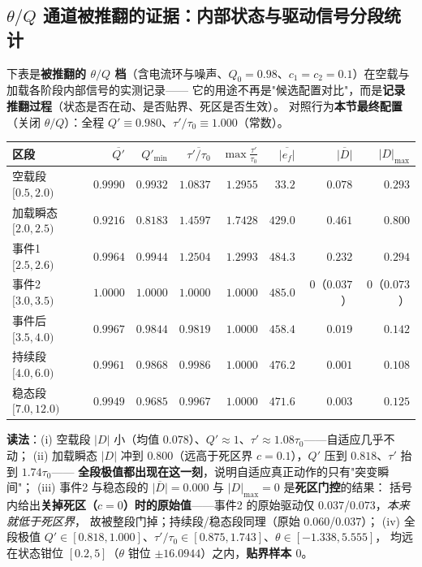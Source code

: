 \documentclass[11pt]{article}
\theoremstyle{remark}\newtheorem{remark}{注}
\newcommand{\ef}{e_f}
\begin{document}
\subsection{$\theta/Q$ 通道被推翻的证据：内部状态与驱动信号分段统计}\label{sec:pmsm-states}
下表是\textbf{被推翻的 $\theta/Q$ 档}（含电流环与噪声、$Q_0=0.98$、$c_1=c_2=0.1$）在空载与加载各阶段内部信号的实测记录——
它的用途不再是"候选配置对比"，而是\textbf{记录推翻过程}（状态是否在动、是否贴界、死区是否生效）。
对照行为\textbf{本节最终配置}（关闭 $\theta/Q$）：全程 $Q'\equiv0.980$、$\tau'/\tau_0\equiv1.000$（常数）。
\begin{center}
\footnotesize
\begin{tabular}{@{}lrrrrrrr@{}}
\toprule
区段 & $\overline{Q'}$ & $Q'_{\min}$ & $\overline{\tau'/\tau_0}$ & $\max\frac{\tau'}{\tau_0}$ & $\overline{|\ef|}$ & $\overline{|D|}$ & $|D|_{\max}$\\
\midrule
空载段 $[0.5,2.0)$ & $0.9990$ & $0.9932$ & $1.0837$ & $1.2955$ & $33.2$ & $0.078$ & $0.293$\\
加载瞬态 $[2.0,2.5)$ & $\mathbf{0.9216}$ & $\mathbf{0.8183}$ & $\mathbf{1.4597}$ & $\mathbf{1.7428}$ & $429.0$ & $\mathbf{0.461}$ & $\mathbf{0.800}$\\
事件1 $[2.5,2.6)$ & $0.9964$ & $0.9944$ & $1.2504$ & $1.2993$ & $484.3$ & $0.232$ & $0.294$\\
事件2 $[3.0,3.5)$ & $1.0000$ & $1.0000$ & $1.0000$ & $1.0000$ & $485.0$ & $0$（$0.037$） & $0$（$0.073$）\\
事件后 $[3.5,4.0)$ & $0.9967$ & $0.9844$ & $0.9819$ & $1.0000$ & $458.4$ & $0.019$ & $0.142$\\
持续段 $[4.0,6.0)$ & $0.9961$ & $0.9868$ & $0.9986$ & $1.0000$ & $476.2$ & $0.001$ & $0.108$\\
稳态段 $[7.0,12.0)$ & $0.9949$ & $0.9685$ & $0.9967$ & $1.0000$ & $471.6$ & $0.003$ & $0.125$\\
\bottomrule
\end{tabular}
\end{center}
\noindent\textbf{读法}：(i) 空载段 $|D|$ 小（均值 $0.078$）、$Q'\approx1$、$\tau'\approx1.08\tau_0$——自适应几乎不动；
(ii) 加载瞬态 $|D|$ 冲到 $0.800$（远高于死区界 $c=0.1$），$Q'$ 压到 $0.818$、$\tau'$ 抬到 $1.74\tau_0$——
\textbf{全段极值都出现在这一刻}，说明自适应真正动作的只有"突变瞬间"；
(iii) 事件2 与稳态段的 $\overline{|D|}=0.000$ 与 $|D|_{\max}=0$ 是\textbf{死区门控}的结果：
括号内给出\textbf{关掉死区（$c=0$）时的原始值}——事件2 的原始驱动仅 $0.037$/$0.073$，\emph{本来就低于死区界}，
故被整段门掉；持续段/稳态段同理（原始 $0.060$/$0.037$）；
(iv) 全段极值 $Q'\in[0.818,1.000]$、$\tau'/\tau_0\in[0.875,1.743]$、$\theta\in[-1.338,5.555]$，
均远在状态钳位 $[0.2,5]$（$\theta$ 钳位 $\pm16.0944$）之内，\textbf{贴界样本 $0$}。
\end{document}
